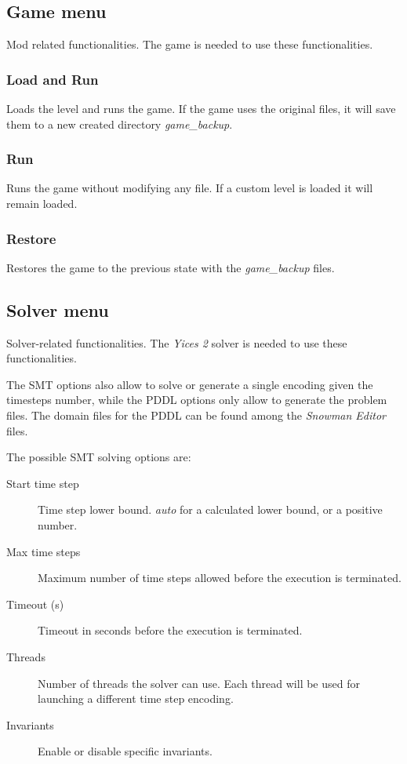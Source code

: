 \documentclass{report}
\theoremstyle{plain}
\begin{document}
\subsection{Game menu}
Mod related functionalities. The game is needed to use these functionalities.

\subsubsection{Load and Run}
Loads the level and runs the game. If the game uses the original files, it will save them to a new created directory \emph{game\_backup}.

\subsubsection{Run}
Runs the game without modifying any file. If a custom level is loaded it will remain loaded.

\subsubsection{Restore}
Restores the game to the previous state with the \emph{game\_backup} files.

\subsection{Solver menu}
Solver-related functionalities. The \emph{Yices 2} solver is needed to use these functionalities.

The SMT options also allow to solve or generate a single encoding given the timesteps number, while the PDDL options only allow to generate the problem files. The domain files for the PDDL can be found among the \emph{Snowman Editor} files.

The possible SMT solving options are:
\begin{description}
    \item[Start time step] Time step lower bound. \textit{auto} for a calculated lower bound, or a positive number.
    \item[Max time steps] Maximum number of time steps allowed before the execution is terminated.
    \item[Timeout (s)] Timeout in seconds before the execution is terminated.
    \item[Threads] Number of threads the solver can use. Each thread will be used for launching a different time step encoding.
    \item[Invariants] Enable or disable specific invariants.
\end{description}
\end{document}
